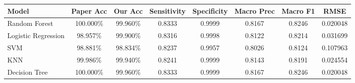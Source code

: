 \begin{tabular}{lccccccc}
\toprule
Model & Paper Acc & Our Acc & Sensitivity & Specificity & Macro Prec & Macro F1 & RMSE \\ \midrule
Random Forest & 100.000\% & 99.960\% & 0.8333 & 0.9999 & 0.8167 & 0.8246 & 0.020048 \\
Logistic Regression & 98.957\% & 99.900\% & 0.8316 & 0.9998 & 0.8122 & 0.8214 & 0.031699 \\
SVM & 98.881\% & 98.834\% & 0.8237 & 0.9957 & 0.8026 & 0.8124 & 0.107963 \\
KNN & 99.986\% & 99.940\% & 0.8241 & 0.9999 & 0.8143 & 0.8191 & 0.024554 \\
Decision Tree & 100.000\% & 99.960\% & 0.8333 & 0.9999 & 0.8167 & 0.8246 & 0.020048 \\
\bottomrule
\end{tabular}
